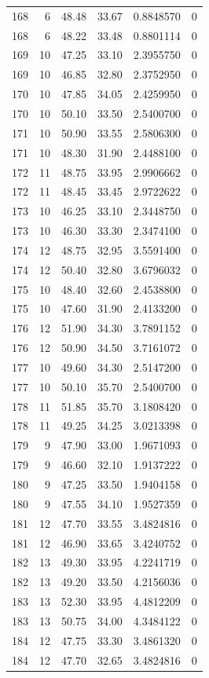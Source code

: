 \documentclass[
  letterpaper,
  DIV=11,
  numbers=noendperiod]{scrreprt}
\renewcommand{\[}{\begin{equation}}
\renewcommand{\]}{\end{equation}}
\begin{document}
\begin{table}
\begin{tabular*}{\linewidth}{@{\extracolsep{\fill}}rrrrrr}
168 & 6 & 48.48 & 33.67 & 0.8848570 & 0 \\ 
168 & 6 & 48.22 & 33.48 & 0.8801114 & 0 \\ 
169 & 10 & 47.25 & 33.10 & 2.3955750 & 0 \\ 
169 & 10 & 46.85 & 32.80 & 2.3752950 & 0 \\ 
170 & 10 & 47.85 & 34.05 & 2.4259950 & 0 \\ 
170 & 10 & 50.10 & 33.50 & 2.5400700 & 0 \\ 
171 & 10 & 50.90 & 33.55 & 2.5806300 & 0 \\ 
171 & 10 & 48.30 & 31.90 & 2.4488100 & 0 \\ 
172 & 11 & 48.75 & 33.95 & 2.9906662 & 0 \\ 
172 & 11 & 48.45 & 33.45 & 2.9722622 & 0 \\ 
173 & 10 & 46.25 & 33.10 & 2.3448750 & 0 \\ 
173 & 10 & 46.30 & 33.30 & 2.3474100 & 0 \\ 
174 & 12 & 48.75 & 32.95 & 3.5591400 & 0 \\ 
174 & 12 & 50.40 & 32.80 & 3.6796032 & 0 \\ 
175 & 10 & 48.40 & 32.60 & 2.4538800 & 0 \\ 
175 & 10 & 47.60 & 31.90 & 2.4133200 & 0 \\ 
176 & 12 & 51.90 & 34.30 & 3.7891152 & 0 \\ 
176 & 12 & 50.90 & 34.50 & 3.7161072 & 0 \\ 
177 & 10 & 49.60 & 34.30 & 2.5147200 & 0 \\ 
177 & 10 & 50.10 & 35.70 & 2.5400700 & 0 \\ 
178 & 11 & 51.85 & 35.70 & 3.1808420 & 0 \\ 
178 & 11 & 49.25 & 34.25 & 3.0213398 & 0 \\ 
179 & 9 & 47.90 & 33.00 & 1.9671093 & 0 \\ 
179 & 9 & 46.60 & 32.10 & 1.9137222 & 0 \\ 
180 & 9 & 47.25 & 33.50 & 1.9404158 & 0 \\ 
180 & 9 & 47.55 & 34.10 & 1.9527359 & 0 \\ 
181 & 12 & 47.70 & 33.55 & 3.4824816 & 0 \\ 
181 & 12 & 46.90 & 33.65 & 3.4240752 & 0 \\ 
182 & 13 & 49.30 & 33.95 & 4.2241719 & 0 \\ 
182 & 13 & 49.20 & 33.50 & 4.2156036 & 0 \\ 
183 & 13 & 52.30 & 33.95 & 4.4812209 & 0 \\ 
183 & 13 & 50.75 & 34.00 & 4.3484122 & 0 \\ 
184 & 12 & 47.75 & 33.30 & 3.4861320 & 0 \\ 
184 & 12 & 47.70 & 32.65 & 3.4824816 & 0 \\ 
\bottomrule
\end{tabular*}
\end{table}
\end{document}
